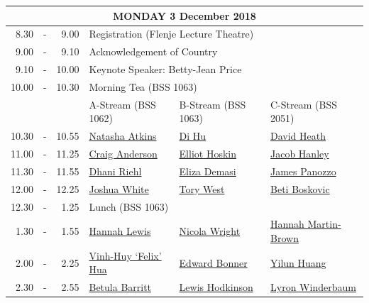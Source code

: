 \documentclass[twoside,12pt,a4paper,notitlepage]{memoir}
\begin{document}
\renewcommand{\arraystretch}{1.4}
\begin{center}
\begin{tabular}{rcr|p{3.6cm}|p{3.6cm}|p{3.6cm}}
\multicolumn{6}{c}{{\large MONDAY 3 December 2018}} \\ \hline
8.30 & - & 9.00 & \multicolumn{3}{l}{Registration (Flenje Lecture Theatre)} \\ \hline
9.00 & - & 9.10 & \multicolumn{3}{l}{Acknowledgement of Country} \\ \hline
9.10 & - & 10.00 & \multicolumn{3}{l}{Keynote Speaker: Betty-Jean Price} \\ \hline
10.00 & - & 10.30 & \multicolumn{3}{l}{Morning Tea (BSS 1063)} \\ \hline
 & & & A-Stream \hspace{1cm} (BSS 1062) & B-Stream \hspace{1cm} (BSS 1063) & C-Stream \hspace{1cm} (BSS 2051) \\ \hline
 10.30 & - & 10.55 & 
 \hyperref[aut:atkins]{Natasha Atkins} & 
 \hyperref[aut:hu]{Di Hu} &  
 \hyperref[aut:heath]{David Heath} \\ \hline
11.00 & - & 11.25 &
 \hyperref[aut:anderson]{Craig Anderson} &
 \hyperref[aut:hoskin]{Elliot Hoskin} &
 \hyperref[aut:hanley]{Jacob Hanley} \\ \hline
11.30 & - & 11.55 &
 \hyperref[aut:riehl]{Dhani Riehl} &
 \hyperref[aut:demasi]{Eliza Demasi} &
 \hyperref[aut:panozzo]{James Panozzo} \\ \hline
12.00 & - & 12.25 &
 \hyperref[aut:white]{Joshua White} &
 \hyperref[aut:west]{Tory West} &
 \hyperref[aut:boskovic]{Beti Boskovic} \\ \hline
12.30 & - & 1.25 & \multicolumn{3}{l}{Lunch (BSS 1063)} \\ \hline
1.30 & - & 1.55 &
 \hyperref[aut:lewis]{Hannah Lewis} &
 \hyperref[aut:wright]{Nicola Wright} &
 \hyperref[aut:brown]{Hannah Martin-Brown} \\ \hline
2.00 & - & 2.25 &
 \hyperref[aut:hua]{Vinh-Huy `Felix' Hua} &
 \hyperref[aut:bonner]{Edward Bonner} &
 \hyperref[aut:huang]{Yilun Huang} \\ \hline
2.30 & - & 2.55 &
 \hyperref[aut:barritt]{Betula Barritt} &
 \hyperref[aut:hodkinson]{Lewis Hodkinson} &
 \hyperref[aut:winderbaum]{Lyron Winderbaum} \\ \hline
\end{tabular}
\end{center}
\vfill
\end{document}
